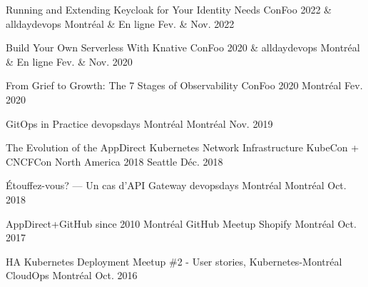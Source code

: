 \begin{cvhonors}

  \cvhonor
    {Running and Extending Keycloak for Your Identity Needs} %
    {ConFoo 2022 \& alldaydevops} %
    {} %
    {Montréal \& En ligne} %
    {Fev. \& Nov. 2022} %

  \cvhonor
    {Build Your Own Serverless With Knative} %
    {ConFoo 2020 \& alldaydevops} %
    {} %
    {Montréal \& En ligne} %
    {Fev. \& Nov. 2020} %

  \cvhonor
    {From Grief to Growth: The 7 Stages of Observability} %
    {ConFoo 2020} %
    {} %
    {Montréal} %
    {Fev. 2020} %

  \cvhonor
    {GitOps in Practice} %
    {devopsdays Montréal} %
    {} %
    {Montréal} %
    {Nov. 2019} %

  \cvhonor
    {The Evolution of the AppDirect Kubernetes Network Infrastructure} %
    {KubeCon + CNCFCon North America 2018} %
    {} %
    {Seattle} %
    {Déc. 2018} %

  \cvhonor
    {Étouffez-vous? — Un cas d’API Gateway} %
    {devopsdays Montréal} %
    {} %
    {Montréal} %
    {Oct. 2018} %

  \cvhonor
    {AppDirect+GitHub since 2010} %
    {Montréal GitHub Meetup} %
    {} %
    {Shopify Montréal} %
    {Oct. 2017} %

  \cvhonor
    {HA Kubernetes Deployment} %
    {Meetup \#2 - User stories, Kubernetes-Montréal} %
    {} %
    {CloudOps Montréal} %
    {Oct. 2016} %

\end{cvhonors}